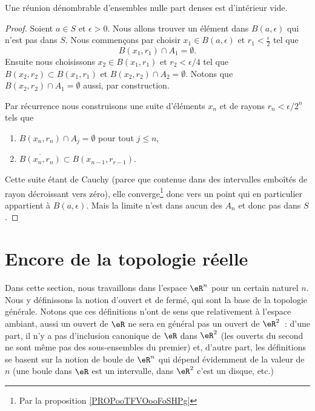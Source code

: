 \begin{theorem}      \label{ThoQGalIO}
    Une réunion dénombrable d'ensembles nulle part denses est d'intérieur vide.
\end{theorem}

\begin{proof}
    Soient \( a\in S\) et \( \epsilon>0\). Nous allons trouver un élément dans \( B(a,\epsilon)\) qui n'est pas dans \( S\). Nous commençons par choisir \( x_1\in B(a,\epsilon)\) et \( r_1<\frac{ \epsilon }{2}\) tel que
    \begin{equation}
        B(x_1,r_1)\cap A_1=\emptyset.
    \end{equation}
    Ensuite nous choisissons \( x_2\in B(x_1,r_1)\) et \( r_2<\epsilon/4\) tel que \( B(x_2,r_2)\subset B(x_1,r_1)\) et \( B(x_2,r_2)\cap A_2=\emptyset\). Notons que \( B(x_2,r_2)\cap A_1=\emptyset\) aussi, par construction.

    Par récurrence nous construisons une suite d'éléments \( x_n\) et de rayons \( r_n<\epsilon/2^n\) tels que
    \begin{enumerate}
        \item
            \( B(x_n,r_n)\cap A_j=\emptyset\) pour tout \( j\leq n\),
        \item
            \( \overline{ B(x_n,r_n) }\subset B(x_{n-1},r_{r-1})\).
    \end{enumerate}
    Cette suite étant de Cauchy (parce que contenue dans des intervalles emboîtés de rayon décroissant vers zéro), elle converge\footnote{Par la proposition \ref{PROPooTFVOooFoSHPg}} donc vers un point qui en particulier appartient à \( B(a,\epsilon)\). Mais la limite n'est dans aucun des \( A_n\) et donc pas dans \( S\).
\end{proof}

\section{Encore de la topologie réelle}

Dans cette section, nous travaillons dans l'espace $\eR^n$ pour un certain naturel $n$. Nous y définissons la notion d'ouvert et de fermé, qui sont la base de la topologie générale. Notons que ces définitions n'ont de sens que relativement à l'espace ambiant, aussi un ouvert de $\eR$ ne sera en général pas un ouvert de $\eR^2$~: d'une part, il n'y a pas d'inclusion canonique de $\eR$ dans $\eR^2$ (les ouverts du second ne sont même pas des sous-ensembles du premier) et, d'autre part, les définitions se basent sur la notion de boule de $\eR^n$ qui dépend évidemment de la valeur de $n$ (une boule dans $\eR$ est un intervalle, dans $\eR^2$ c'est un disque, etc.)

